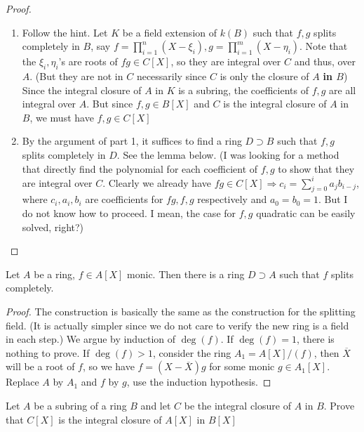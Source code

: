 \documentclass{solution}
\begin{document}
\begin{proof}
    \begin{enumerate}
        \item Follow the hint. Let $K$ be a field extension of $k(B)$ such that $f, g$ splits completely in $B$, say $f = \prod\limits_{i = 1}^{n} (X - \xi_i), g = \prod\limits_{i = 1}^{m} (X - \eta_i)$. Note that the $\xi_i, \eta_i$'s are roots of $fg \in C[X]$, so they are integral over $C$ and thus, over $A$. ({\color{red}But they are not in $C$ necessarily since $C$ is only the closure of $A$ \textbf{in $B$}}) Since the integral closure of $A$ in $K$ is a subring, the coefficients of $f, g$ are all integral over $A$. But since $f, g \in B[X]$ and $C$ is the integral closure of $A$ in $B$, we must have $f, g \in C[X]$
        \item By the argument of part 1, it suffices to find a ring $D \supset B$ such that $f, g$ splits completely in $D$. See the lemma below. ({\color{red}I was looking for a method that directly find the polynomial for each coefficient of $f, g$ to show that they are integral over $C$. Clearly we already have $fg \in C[X] \Rightarrow c_i = \sum\limits_{j = 0}^{i} a_jb_{i - j}$, where $c_i, a_i, b_i$ are coefficients for $fg, f, g$ respectively and $a_0 = b_0 = 1$. But I do not know how to proceed. I mean, the case for $f, g$ quadratic can be easily solved, right?})
    \end{enumerate}
\end{proof}

\begin{lemma}
    Let $A$ be a ring, $f \in A[X]$ monic. Then there is a ring $D \supset A$ such that $f$ splits completely.
\end{lemma}

\begin{proof}
    The construction is basically the same as the construction for the splitting field. (It is actually simpler since we do not care to verify the new ring is a field in each step.) We argue by induction of $\deg (f)$. If $\deg(f) = 1$, there is nothing to prove. If $\deg(f) \gt 1$, consider the ring $A_1 = A[X] / (f)$, then $\overline{X}$ will be a root of $f$, so we have $f = (X - \overline{X})g$ for some monic $g \in A_1[X]$. Replace $A$ by $A_1$ and $f$ by $g$, use the induction hypothesis.
\end{proof}

\begin{problem}
    Let $A$ be a subring of a ring $B$ and let $C$ be the integral closure of $A$ in $B$. Prove that $C[X]$ is the integral closure of $A[X]$ in $B[X]$
\end{problem}
\end{document}
